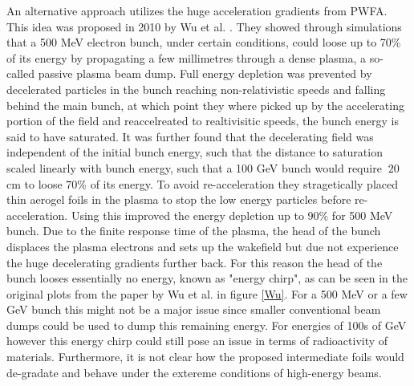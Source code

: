 \documentclass[%
 onecolumn,notitlepage,
 amsmath,amssymb,
 aps,
 longbibliography
]{revtex4-1}
\begin{document}
An alternative approach utilizes the huge acceleration gradients from PWFA. This idea was proposed in 2010 by Wu et al. \cite{Wu2010}. They showed through simulations that a 500 MeV electron bunch, under certain conditions, could loose up to 70\% of its energy by propagating a few millimetres through a dense plasma, a so-called passive plasma beam dump. Full energy depletion was prevented by decelerated particles in the bunch reaching non-relativistic speeds and falling behind the main bunch, at which point they where picked up by the accelerating portion of the field and reaccelreated to realtivisitic speeds, the bunch energy is said to have saturated. It was further found that the decelerating field was independent of the initial bunch energy, such that the distance to saturation scaled linearly with bunch energy, such that a 100 GeV bunch would require $~20$ cm to loose 70\% of its energy. To avoid re-acceleration they stragetically placed thin aerogel foils in the plasma to stop the low energy particles before re-acceleration. Using this improved the energy depletion up to 90\% for 500 MeV bunch.  Due to the finite response time of the plasma, the head of the bunch displaces the plasma electrons and sets up the wakefield but due not experience the huge decelerating gradients further back. For this reason the head of the bunch looses essentially no energy, known as "energy chirp", as can be seen in the original plots from the paper by Wu et al.  in figure \ref{Wu}. For a 500 MeV or a few GeV bunch this might not be a major issue since smaller conventional beam dumps could be used to dump this remaining energy. For energies of 100s of GeV however this energy chirp could still pose an issue in terms of radioactivity of materials. Furthermore, it is not clear how the proposed intermediate foils would de-gradate and behave under the extereme conditions of high-energy beams.\\
\end{document}
